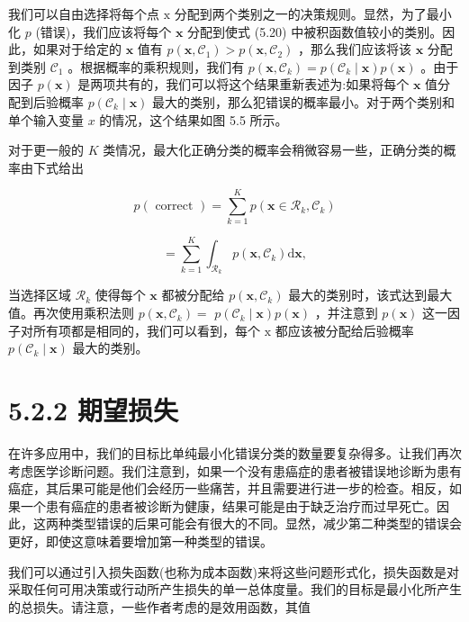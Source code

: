 \documentclass[10pt]{report}
\begin{document}
我们可以自由选择将每个点 \(\mathrm{x}\) 分配到两个类别之一的决策规则。显然，为了最小化 \(p\) (错误)，我们应该将每个 \(\mathbf{x}\) 分配到使式 (5.20) 中被积函数值较小的类别。因此，如果对于给定的 \(\mathbf{x}\) 值有 \(p\left( {\mathbf{x},{\mathcal{C}}_{1}}\right)  > p\left( {\mathbf{x},{\mathcal{C}}_{2}}\right)\) ，那么我们应该将该 \(\mathbf{x}\) 分配到类别 \({\mathcal{C}}_{1}\) 。根据概率的乘积规则，我们有 \(p\left( {\mathbf{x},{\mathcal{C}}_{k}}\right)  = p\left( {{\mathcal{C}}_{k} \mid  \mathbf{x}}\right) p\left( \mathbf{x}\right)\) 。由于因子 \(p\left( \mathbf{x}\right)\) 是两项共有的，我们可以将这个结果重新表述为:如果将每个 \(\mathbf{x}\) 值分配到后验概率 \(p\left( {{\mathcal{C}}_{k} \mid  \mathbf{x}}\right)\) 最大的类别，那么犯错误的概率最小。对于两个类别和单个输入变量 \(x\) 的情况，这个结果如图 5.5 所示。

对于更一般的 \(K\) 类情况，最大化正确分类的概率会稍微容易一些，正确分类的概率由下式给出

\[
p\left( \text{ correct }\right)  = \mathop{\sum }\limits_{{k = 1}}^{K}p\left( {\mathbf{x} \in  {\mathcal{R}}_{k},{\mathcal{C}}_{k}}\right)
\]

\[
= \mathop{\sum }\limits_{{k = 1}}^{K}{\int }_{{\mathcal{R}}_{k}}p\left( {\mathbf{x},{\mathcal{C}}_{k}}\right) \mathrm{d}\mathbf{x}, \tag{5.21}
\]

当选择区域 \({\mathcal{R}}_{k}\) 使得每个 \(\mathbf{x}\) 都被分配给 \(p\left( {\mathbf{x},{\mathcal{C}}_{k}}\right)\) 最大的类别时，该式达到最大值。再次使用乘积法则 \(p\left( {\mathbf{x},{\mathcal{C}}_{k}}\right)  =\)  \(p\left( {{\mathcal{C}}_{k} \mid  \mathbf{x}}\right) p\left( \mathbf{x}\right)\) ，并注意到 \(p\left( \mathbf{x}\right)\) 这一因子对所有项都是相同的，我们可以看到，每个 \(\mathrm{x}\) 都应该被分配给后验概率 \(p\left( {{\mathcal{C}}_{k} \mid  \mathbf{x}}\right)\) 最大的类别。

\section*{5.2.2 期望损失}

在许多应用中，我们的目标比单纯最小化错误分类的数量要复杂得多。让我们再次考虑医学诊断问题。我们注意到，如果一个没有患癌症的患者被错误地诊断为患有癌症，其后果可能是他们会经历一些痛苦，并且需要进行进一步的检查。相反，如果一个患有癌症的患者被诊断为健康，结果可能是由于缺乏治疗而过早死亡。因此，这两种类型错误的后果可能会有很大的不同。显然，减少第二种类型的错误会更好，即使这意味着要增加第一种类型的错误。

我们可以通过引入损失函数(也称为成本函数)来将这些问题形式化，损失函数是对采取任何可用决策或行动所产生损失的单一总体度量。我们的目标是最小化所产生的总损失。请注意，一些作者考虑的是效用函数，其值
\end{document}
